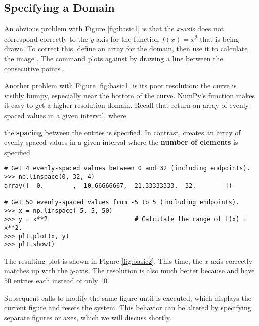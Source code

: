 \subsection*{Specifying a Domain} %

An obvious problem with Figure \ref{fig:basic1} is that the $x$-axis does not correspond correctly to the $y$-axis for the function $f(x) = x^2$ that is being drawn.
To correct this, define an array  for the domain, then use it to calculate the image .
The command  plots  against  by drawing a line between the consecutive points .

Another problem with Figure \ref{fig:basic1} is its poor resolution: the curve is visibly bumpy, especially near the bottom of the curve.
NumPy's  function makes it easy to get a higher-resolution domain.
Recall that  return an array of evenly-spaced values in a given interval, where


\noindent the \textbf{spacing} between the entries is specified.
In contrast,  creates an array of evenly-spaced values in a given interval where the \textbf{number of elements} is specified.

\begin{lstlisting}
# Get 4 evenly-spaced values between 0 and 32 (including endpoints).
>>> np.linspace(0, 32, 4)
array([  0.        ,  10.66666667,  21.33333333,  32.        ])

# Get 50 evenly-spaced values from -5 to 5 (including endpoints).
>>> x = np.linspace(-5, 5, 50)
>>> y = x**2                        # Calculate the range of f(x) = x**2.
>>> plt.plot(x, y)
>>> plt.show()
\end{lstlisting}

The resulting plot is shown in Figure \ref{fig:basic2}.
This time, the $x$-axis correctly matches up with the $y$-axis.
The resolution is also much better because  and  have $50$ entries each instead of only $10$.

Subsequent calls to  modify the same figure until  is executed, which displays the current figure and resets the system.
This behavior can be altered by specifying separate figures or axes, which we will discuss shortly.

